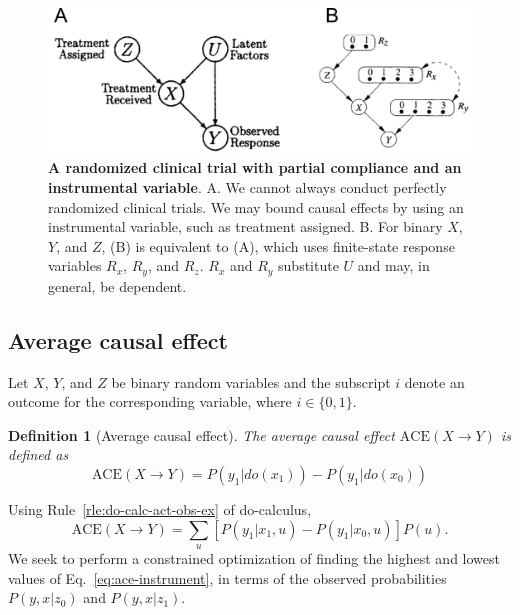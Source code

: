 \documentclass[11pt]{article}
\numberwithin{equation}{section}
\newtheorem{defn}{Definition}[section]
\begin{document}
\begin{figure}
\begin{center}
\includegraphics[width=0.8\columnwidth]{figures/partial-compliance-instrument.png}  
\end{center}
\caption{\textbf{A randomized clinical trial with partial compliance and an instrumental variable}. A. We cannot always conduct perfectly randomized clinical trials. We may bound causal effects by using an instrumental variable, such as treatment assigned. B. For binary $X$, $Y$, and $Z$, (B) is equivalent to (A), which uses finite-state response variables $R_x$, $R_y$, and $R_z$. $R_x$ and $R_y$ substitute $U$ and may, in general, be dependent.}
\label{Fig:partial-compliance-instrument}
\end{figure}

\subsection{Average causal effect}

Let $X$, $Y$, and $Z$ be binary random variables and the subscript $i$ denote an outcome for the corresponding variable, where $i \in \{0,1\}$.
\begin{defn}[Average causal effect]
The average causal effect $\text{ACE}(X\rightarrow Y)$ is defined as
\begin{equation}
\text{ACE}(X\rightarrow Y) = P(y_1|do(x_1)) - P(y_1|do(x_0))
\end{equation}
\end{defn}

Using Rule~\ref{rle:do-calc-act-obs-ex} of do-calculus,
\begin{equation}
\text{ACE}(X\rightarrow Y) = \sum_u [P(y_1|x_1, u) - P(y_1|x_0,u)]P(u). \label{eq:ace-instrument}
\end{equation}
We seek to perform a constrained optimization of finding the highest and lowest values of Eq.~\eqref{eq:ace-instrument}, in terms of the observed probabilities $P(y,x|z_0)$ and $P(y,x|z_1)$. 
\end{document}
